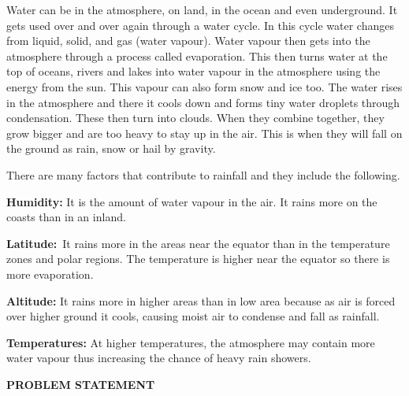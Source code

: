 \documentclass[12pt]{article}
\begin{document}
{\fontsize{13pt}{15.6pt}\selectfont  Water can be in the atmosphere, on land, in the ocean and even underground. It gets used over and over again through a water cycle. In this cycle water changes from liquid, solid, and gas (water vapour). Water vapour then gets into the atmosphere through a process called evaporation. This then turns water at the top of oceans, rivers and lakes into water vapour in the atmosphere using the energy from the sun. This vapour can also form snow and ice too. The water rises in the atmosphere and there it cools down and forms tiny water droplets through condensation. These then turn into clouds. When they combine together, they grow bigger and are too heavy to stay up in the air. This is when they will fall on the ground as rain, snow or hail by gravity.\par}\par

{\fontsize{13pt}{15.6pt}\selectfont There are many factors that contribute to rainfall and they include the following.\par}\par

{\fontsize{13pt}{15.6pt}\selectfont \textbf{Humidity:} It is the amount of water vapour in the air. It rains more on the coasts than in an inland.\par}\par

{\fontsize{13pt}{15.6pt}\selectfont \textbf{Latitude:}\  It rains more in the areas near the equator than in the temperature zones and polar regions. The temperature is higher near the equator so there is more evaporation.\par}\par

{\fontsize{13pt}{15.6pt}\selectfont \textbf{Altitude:} It rains more in higher areas than in low area because as air is forced over higher ground it cools, causing moist air to condense and fall as rainfall.\par}\par

{\fontsize{13pt}{15.6pt}\selectfont \textbf{Temperatures:} At higher temperatures, the atmosphere may contain more water vapour thus increasing the chance of heavy rain showers.\par}\par


\vspace{\baselineskip}
\begin{Center}
{\fontsize{13pt}{15.6pt}\selectfont \textbf{PROBLEM STATEMENT}\par}
\end{Center}\par
\end{document}
